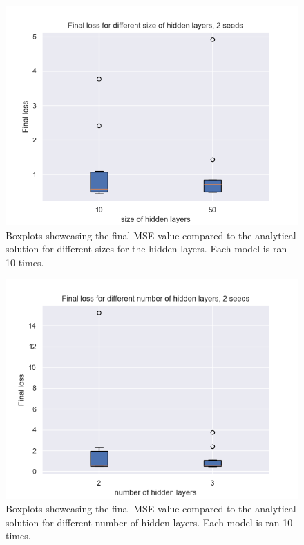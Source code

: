 \begin{figure}[h!]
    \centering
    \includegraphics[width=1.0\linewidth]{project_3/plots/value_layers_search.png}
    \caption{Boxplots showcasing the final MSE value compared to the analytical solution for different sizes for the hidden layers. Each model is ran 10 times. }
    \label{fig:boxplots_size_of_layers}
\end{figure}

\begin{figure}[h!]
    \centering
    \includegraphics[width=1.0\linewidth]{project_3/plots/n_layers_search.png}
    \caption{Boxplots showcasing the final MSE value compared to the analytical solution for different number of hidden layers. Each model is ran 10 times.}
    \label{fig:boxplots_number_of_hidden_layers}
\end{figure}


